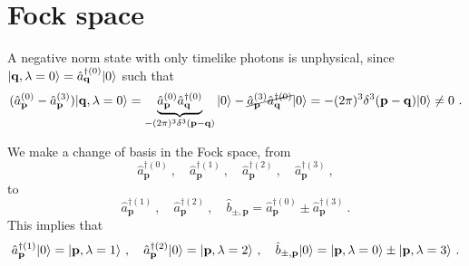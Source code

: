 \section{Fock space}

    A negative norm state with only timelike photons is unphysical, since $\vert\mathbf q, \lambda = 0\rangle = \hat a^{\dagger (0)}_{\mathbf q} \vert0\rangle$ such that 
    \begin{equation*}
        (\hat a^{(0)}_{\mathbf p} - \hat a^{(3)}_{\mathbf p}) \vert\mathbf q, \lambda = 0\rangle = \underbrace{\hat a^{(0)}_{\mathbf p} \hat a^{\dagger (0)}_{\mathbf q}}_{- (2\pi)^3 \delta^3 (\mathbf p - \mathbf q)} \vert0\rangle - \cancel{\hat a^{(3)}_{\mathbf p} \hat a^{\dagger (0)}_{\mathbf q}} \vert0\rangle = - (2\pi)^3 \delta^3 (\mathbf p - \mathbf q) \vert0\rangle \neq 0 ~.
    \end{equation*}

    We make a change of basis in the Fock space, from 
    \begin{equation*}
        \hat a^{\dagger(0)}_{\mathbf p} ~, \quad \hat a^{\dagger(1)}_{\mathbf p} ~, \quad \hat a^{\dagger(2)}_{\mathbf p} ~, \quad \hat a^{\dagger(3)}_{\mathbf p} ~,
    \end{equation*}
    to 
    \begin{equation*}
        \hat a^{\dagger(1)}_{\mathbf p} ~, \quad \hat a^{\dagger(2)}_{\mathbf p} ~, \quad \hat b_{\pm, \mathbf p} = \hat a^{\dagger(0)}_{\mathbf p} \pm \hat a^{\dagger(3)}_{\mathbf p} ~.
    \end{equation*}
    This implies that 
    \begin{equation*}
        \hat a^{\dagger(1)}_{\mathbf p} \vert0\rangle = \vert\mathbf p, \lambda = 1\rangle ~, \quad \hat a^{\dagger(2)}_{\mathbf p} \vert0\rangle = \vert\mathbf p, \lambda = 2\rangle ~, \quad \hat b_{\pm, \mathbf p} \vert0\rangle = \vert\mathbf p, \lambda = 0\rangle \pm \vert\mathbf p, \lambda = 3\rangle ~.
    \end{equation*}

